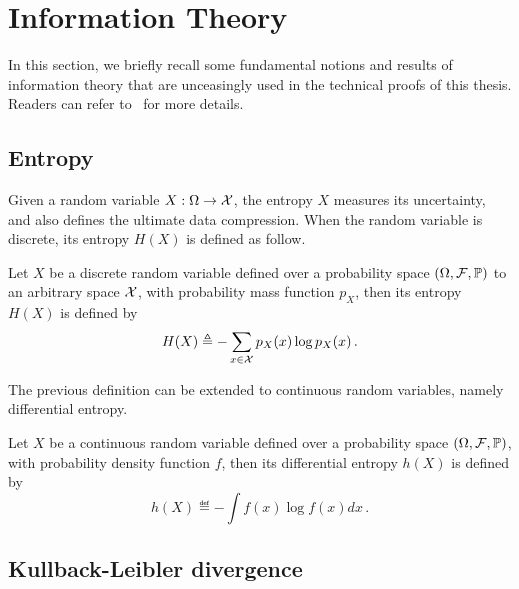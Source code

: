 
\section{Information Theory}\label{app:maths.information}

In this section, we briefly recall some fundamental notions and results of information theory that are unceasingly used in the technical proofs of this thesis. Readers can refer to~\cite{cover2006} for more details.

\subsection{Entropy}\label{app:maths.information.entropy}

Given a random variable $X: \Omega \rightarrow \mathcal{X}$, the \gls{entropy} $X$ measures its uncertainty, and also defines the ultimate data compression. When the random variable is discrete, its entropy $H(X)$ is defined as follow.

\begin{definition}[entropy]\label{def:entropy}
\begin{leftbar}[defnbar]
    Let $X$ be a discrete random variable defined over a probability space $(\Omega,\mathcal{F},\mathbb{P})$ to an arbitrary space $\mathcal{X}$, with probability mass function $p_X$, then its entropy $H(X)$ is defined by
    \[
        H(X) \triangleq - \sum_{x\in\mathcal{X}} p_X(x)\log p_X(x)\,.
    \]
\end{leftbar}
\end{definition}

The previous definition can be extended to continuous random variables, namely \gls{differential entropy}.

\begin{definition}
\begin{leftbar}[defnbar]
    Let $X$ be a continuous random variable defined over a probability space $(\Omega,\mathcal{F},\mathbb{P})$, with probability density function $f$, then its differential entropy $h(X)$ is defined by
    \[
        h(X) \eqdef - \int f(x)\log f(x) dx\,.
    \]
\end{leftbar}
\end{definition}

\subsection{Kullback-Leibler divergence}\label{app:maths.information.kl}

